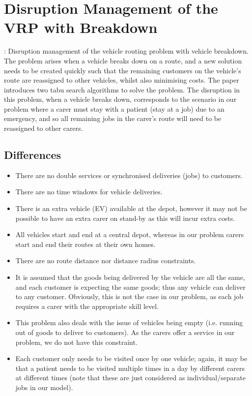 \documentclass[a4paper]{article}
\begin{document}
\section{Disruption Management of the VRP with Breakdown}
\noindent \citet{mu2011}: Disruption management of the vehicle routing problem with vehicle breakdown. The problem arises when a vehicle breaks down on a route, and a new solution needs to be created quickly such that the remaining customers on the vehicle's route are reassigned to other vehicles, whilst also minimising costs. The paper introduces two tabu search algorithms to solve the problem. The disruption in this problem, when a vehicle breaks down, corresponds to the scenario in our problem where a carer must stay with a patient (stay at a job) due to an emergency, and so all remaining jobs in the carer's route will need to be reassigned to other carers.

\subsection{Differences}
\begin{itemize}[label=\textcolor{myYellow}{\textbullet},leftmargin=*,itemsep=-0.1em]
	\item There are no double services or synchronised deliveries (jobs) to customers.
	\item There are no time windows for vehicle deliveries.
	\item There is an extra vehicle (EV) available at the depot, however it may not be possible to have an extra carer on stand-by as this will incur extra costs.
	\item All vehicles start and end at a central depot, whereas in our problem carers start and end their routes at their own homes.
	\item There are no route distance nor distance radius constraints.
	\item It is assumed that the goods being delivered by the vehicle are all the same, and each customer is expecting the same goods; thus any vehicle can deliver to any customer. Obviously, this is not the case in our problem, as each job requires a carer with the appropriate skill level.
	\item This problem also deals with the issue of vehicles being empty (i.e. running out of goods to deliver to customers). As the carers offer a service in our problem, we do not have this constraint.
	\item Each customer only needs to be visited once by one vehicle; again, it may be that a patient needs to be visited multiple times in a day by different carers at different times (note that these are just considered as individual/separate jobs in our model).
\end{itemize}
\end{document}
